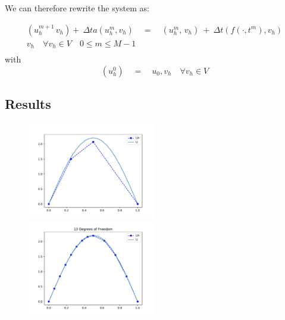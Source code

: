 \documentclass{uonmathreport}
\theoremstyle{definition}
\theoremstyle{problem}
\theoremstyle{theorem}
\begin{document}
We can therefore rewrite the system as:

\begin{align*}
( u_h^{m+1} \, v_h)  + \: \Delta t a(u_h^m, v_h) \quad=\quad (u_h^{m}, \, v_h ) \:+\: \Delta t(f(\cdot, t^m), v_h) \\
v_h \quad \forall v_h \in V \quad 0 \leq m \leq M-1 \\
\end{align*}
with
\begin{equation}
(u^{0}_h) \quad  = \quad u_0, v_h \quad \forall v_h \in V
\end{equation}

\subsection{Results} \label{subsec:results2}


\begin{figure}[h]
   \includegraphics[width=0.5\textwidth]{OriginalPDEcoarse.pdf}
   \includegraphics[width=0.5\textwidth]{OriginalPDEfine.pdf}
   
 \label{fig:OriginalPDEcoarse}
\end{figure}
\end{document}
